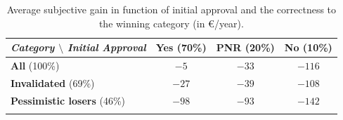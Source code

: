 \documentclass[11pt]{article}
\begin{document}
\begin{appendices}
\begin{table}[H]
\caption[table]{Average subjective gain in function of initial approval and the correctness to the winning category (in \euro{}/year).}
{\label{tab:gains}}
\centering
\begin{tabular}{lccc}
\textit{Category $\setminus$ Initial Approval} & \textbf{Yes} (70\%) & \textbf{PNR} (20\%) & \textbf{No} (10\%) \\
\hline
\textbf{All} (100\%) & $-5$ & $-33$ & $-116$ \\
\textbf{Invalidated} (69\%) & $-27$ & $-39$ & $-108$ \\
\textbf{Pessimistic losers} (46\%) & $-98$ & $-93$ & $-142$ \\ \\
\end{tabular}
\end{table}




\end{appendices}
\end{document}
